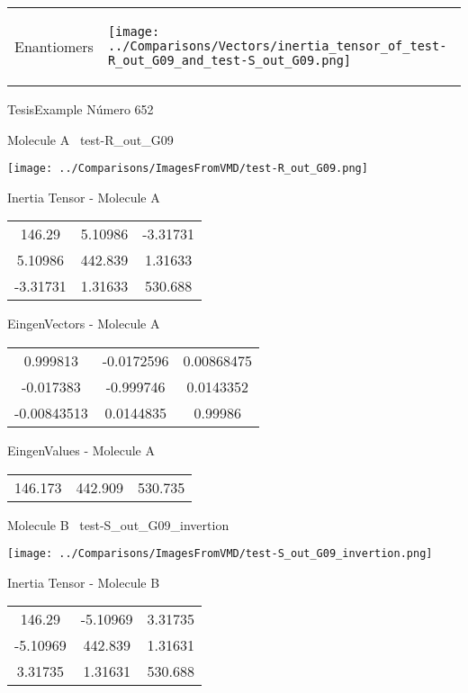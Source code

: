 \vtab[-5mm]
\begin{tabular}{*{2}{m{}}}
\begin{center}
\textcolor{NavyBlue}{\Large Enantiomers}
\end{center}
&
\begin{center}
\texttt{[image: ../Comparisons/Vectors/inertia\_tensor\_of\_test-R\_out\_G09\_and\_test-S\_out\_G09.png]}
\end{center}
\end{tabular}

 \newpage

\vtab[-3cm]
\begin{center}
{\large TesisExample \tab Número 652}
\end{center}
\begin{multicols}{2}
\begin{center}

Molecule A \
test-R\_out\_G09

\texttt{[image: ../Comparisons/ImagesFromVMD/test-R\_out\_G09.png]}

Inertia Tensor - Molecule A \\
\begin{tabular}{|c c c|}
146.29	 & 	5.10986	 & 	-3.31731	 \\
5.10986	 & 	442.839	 & 	1.31633	 \\
-3.31731	 & 	1.31633	 & 	530.688
\end{tabular}

\vtab
 EingenVectors - Molecule A     \\
\begin{tabular}{|c c c|}
0.999813	 & 	-0.0172596	 & 	0.00868475	 \\
-0.017383	 & 	-0.999746	 & 	0.0143352	 \\
-0.00843513	 & 	0.0144835	 & 	0.99986
\end{tabular}

\vtab
 EingenValues - Molecule A     \\
\begin{tabular}{|c c c|}
146.173	 & 	442.909	 & 	530.735	 \\
\end{tabular}
\columnbreak

Molecule B \
test-S\_out\_G09\_invertion

\texttt{[image: ../Comparisons/ImagesFromVMD/test-S\_out\_G09\_invertion.png]}

Inertia Tensor - Molecule B \\
\begin{tabular}{|c c c|}
146.29	 & 	-5.10969	 & 	3.31735	 \\
-5.10969	 & 	442.839	 & 	1.31631	 \\
3.31735	 & 	1.31631	 & 	530.688
\end{tabular}


\end{center}
\end{multicols}
